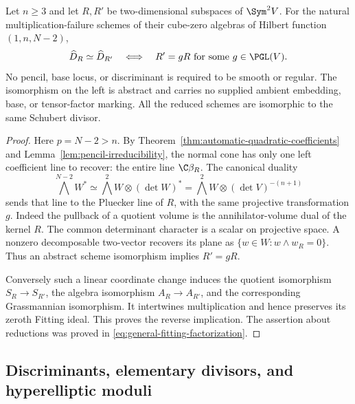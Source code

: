 \begin{theorem}
\label{thm:natural-pencil-reconstruction}
Let \(n\ge3\) and let \(R,R'\) be two-dimensional subspaces
of \(\Sym^2V\).  For the natural multiplication-failure schemes
of their cube-zero algebras of Hilbert function \((1,n,N-2)\),
\begin{equation}\label{eq:natural-pencil-torelli}
 \widehat D_R\simeq\widehat D_{R'}
 \quad\Longleftrightarrow\quad
 R'=gR\text{ for some }g\in\PGL(V).
\end{equation}
No pencil, base locus, or discriminant is required to be smooth or
regular.  The isomorphism on the left is abstract and carries no
supplied ambient embedding, base, or tensor-factor marking.  All the
reduced schemes are isomorphic to the same Schubert divisor.
\end{theorem}
\begin{proof}
Here \(p=N-2>n\).  By
Theorem~\ref{thm:automatic-quadratic-coefficients} and
Lemma~\ref{lem:pencil-irreducibility}, the normal cone has only one
left coefficient line to recover: the entire line \(\C\beta_R\).
The canonical duality
\begin{equation}\label{eq:pencil-exterior-duality}
 \bigwedge^{N-2}W^*\simeq
       \bigwedge^2W\otimes(\det W)^*
       =\bigwedge^2W\otimes(\det V)^{-(n+1)}
\end{equation}
sends that line to the Pluecker line of \(R\), with the same
projective transformation \(g\).  Indeed the pullback of a
quotient volume is the annihilator-volume dual of the kernel
\(R\).  The common determinant character is a scalar on
projective space.  A nonzero decomposable two-vector recovers its
plane as \(\{w\in W:w\wedge w_R=0\}\).  Thus an abstract
scheme isomorphism implies \(R'=gR\).

Conversely such a linear coordinate change induces the quotient
isomorphism \(S_R\to S_{R'}\), the algebra isomorphism
\(A_R\to A_{R'}\), and the corresponding Grassmannian isomorphism.
It intertwines multiplication and hence preserves its zeroth Fitting
ideal.  This proves the reverse implication.  The assertion about
reductions was proved in \eqref{eq:general-fitting-factorization}.
\end{proof}

\subsection{Discriminants, elementary divisors, and hyperelliptic moduli}

